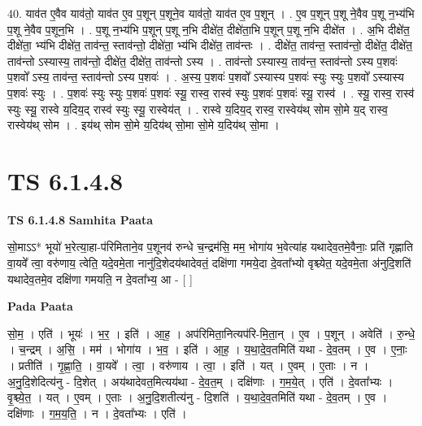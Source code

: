\documentclass[17pt]{extarticle}
\begin{document}
40. याव॑त ए॒वैव याव॑तो॒ याव॑त ए॒व प॒शून् प॒शूने॒व याव॑तो॒ याव॑त ए॒व प॒शून् । . ए॒व प॒शून् प॒शू ने॒वैव प॒शू न॒भ्य॑भि प॒शू ने॒वैव प॒शून॒भि । . प॒शू न॒भ्य॑भि प॒शून् प॒शू न॒भि दीक्षे॑त॒ दीक्षे॑ता॒भि प॒शून् प॒शू न॒भि दीक्षे॑त । . अ॒भि दीक्षे॑त॒ दीक्षे॑ता॒ भ्य॑भि दीक्षे॑त॒ ताव॑न्त॒ स्ताव॑न्तो॒ दीक्षे॑ता॒ भ्य॑भि दीक्षे॑त॒ ताव॑न्तः । . दीक्षे॑त॒ ताव॑न्त॒ स्ताव॑न्तो॒ दीक्षे॑त॒ दीक्षे॑त॒ ताव॑न्तो ऽस्यास्य॒ ताव॑न्तो॒ दीक्षे॑त॒ दीक्षे॑त॒ ताव॑न्तो ऽस्य । . ताव॑न्तो ऽस्यास्य॒ ताव॑न्त॒ स्ताव॑न्तो ऽस्य प॒शवः॑ प॒शवो᳚ ऽस्य॒ ताव॑न्त॒ स्ताव॑न्तो ऽस्य प॒शवः॑ । . अ॒स्य॒ प॒शवः॑ प॒शवो᳚ ऽस्यास्य प॒शवः॑ स्युः स्युः प॒शवो᳚ ऽस्यास्य प॒शवः॑ स्युः । . प॒शवः॑ स्युः स्युः प॒शवः॑ प॒शवः॑ स्यू॒ रास्व॒ रास्व॑ स्युः प॒शवः॑ प॒शवः॑ स्यू॒ रास्व॑ । . स्यू॒ रास्व॒ रास्व॑ स्युः स्यू॒ रास्वे य॒दिय॒द् रास्व॑ स्युः स्यू॒ रास्वेय॑त् । . रास्वे य॒दिय॒द् रास्व॒ रास्वेय॑थ् सोम सो॒मे य॒द् रास्व॒ रास्वेय॑थ् सोम । . इय॑थ् सोम सो॒मे य॒दिय॑थ् सो॒मा सो॒मे य॒दिय॑थ् सो॒मा । \newline
\pagebreak
{}

\section{ TS 6.1.4.8 }

\textbf{TS 6.1.4.8 } \newline
\textbf{Samhita Paata} \newline

सो॒माऽऽ* भूयो॑ भ॒रेत्या॒हा-प॑रिमिताने॒व प॒शूनव॑ रुन्धे च॒न्द्रम॑सि॒ मम॒ भोगा॑य भ॒वेत्या॑ह यथादेव॒तमे॒वैनाः॒ प्रति॑ गृह्णाति वा॒यवे᳚ त्वा॒ वरु॑णाय॒ त्वेति॒ यदे॒वमे॒ता नानु॑दि॒शेदय॑थादेवतं॒ दक्षि॑णा गमये॒दा दे॒वता᳚भ्यो वृश्च्येत॒ यदे॒वमे॒ता अ॑नुदि॒शति॑ यथादेव॒तमे॒व दक्षि॑णा गमयति॒ न दे॒वता᳚भ्य॒ आ - [  ] \newline

\textbf{Pada Paata} \newline

सो॒म॒ । एति॑ । भूयः॑ । भ॒र॒ । इति॑ । आ॒ह॒ । अप॑रिमिता॒नित्यप॑रि-मि॒ता॒न् । ए॒व । प॒शून् । अवेति॑ । रु॒न्धे॒ । च॒न्द्रम् । अ॒सि॒ । मम॑ । भोगा॑य । भ॒व॒ । इति॑ । आ॒ह॒ । य॒था॒दे॒व॒तमिति॑ यथा - दे॒व॒तम् । ए॒व । ए॒नाः॒ । प्रतीति॑ । गृ॒ह्णा॒ति॒ । वा॒यवे᳚ । त्वा॒ । वरु॑णाय । त्वा॒ । इति॑ । यत् । ए॒वम् । ए॒ताः । न । अ॒नु॒दि॒शेदित्य॑नु - दि॒शेत् । अय॑थादेवत॒मित्यय॑था - दे॒व॒त॒म् । दक्षि॑णाः । ग॒म॒ये॒त् । एति॑ । दे॒वता᳚भ्यः । वृ॒श्च्ये॒त॒ । यत् । ए॒वम् । ए॒ताः । अ॒नु॒दि॒शतीत्य॑नु - दि॒शति॑ । य॒था॒दे॒व॒तमिति॑ यथा - दे॒व॒तम् । ए॒व । दक्षि॑णाः । ग॒म॒य॒ति॒ । न । दे॒वता᳚भ्यः । एति॑ ।  \newline
\end{document}
